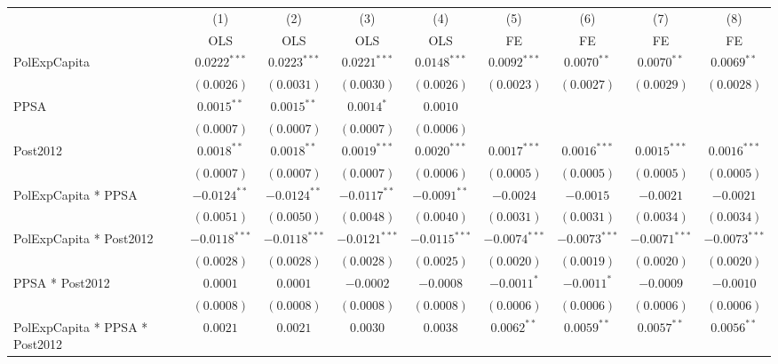 \begin{table}[H]
    \centering
    \scriptsize
    \begin{minipage}{\textwidth}
    \centering
    \begin{tabular}{lcccccccc}
        \toprule
         & (1) & (2) & (3) & (4) & (5) & (6) & (7) & (8) \\
         & OLS & OLS & OLS & OLS & FE & FE & FE & FE \\
        \midrule
        PolExpCapita & $0.0222^{***}$ & $0.0223^{***}$ & $0.0221^{***}$ & $0.0148^{***}$ & $0.0092^{***}$ & $0.0070^{**}$ & $0.0070^{**}$ & $0.0069^{**}$ \\
         & $(0.0026)$ & $(0.0031)$ & $(0.0030)$ & $(0.0026)$ & $(0.0023)$ & $(0.0027)$ & $(0.0029)$ & $(0.0028)$ \\[4pt]
        PPSA & $0.0015^{**}$ & $0.0015^{**}$ & $0.0014^{*}$ & $0.0010$ &  &  &  &  \\
         & $(0.0007)$ & $(0.0007)$ & $(0.0007)$ & $(0.0006)$ &  &  &  &  \\[4pt]
        Post2012 & $0.0018^{**}$ & $0.0018^{**}$ & $0.0019^{***}$ & $0.0020^{***}$ & $0.0017^{***}$ & $0.0016^{***}$ & $0.0015^{***}$ & $0.0016^{***}$ \\
         & $(0.0007)$ & $(0.0007)$ & $(0.0007)$ & $(0.0006)$ & $(0.0005)$ & $(0.0005)$ & $(0.0005)$ & $(0.0005)$ \\[4pt]
        PolExpCapita * PPSA & $-0.0124^{**}$ & $-0.0124^{**}$ & $-0.0117^{**}$ & $-0.0091^{**}$ & $-0.0024$ & $-0.0015$ & $-0.0021$ & $-0.0021$ \\
         & $(0.0051)$ & $(0.0050)$ & $(0.0048)$ & $(0.0040)$ & $(0.0031)$ & $(0.0031)$ & $(0.0034)$ & $(0.0034)$ \\[4pt]
        PolExpCapita * Post2012 & $-0.0118^{***}$ & $-0.0118^{***}$ & $-0.0121^{***}$ & $-0.0115^{***}$ & $-0.0074^{***}$ & $-0.0073^{***}$ & $-0.0071^{***}$ & $-0.0073^{***}$ \\
         & $(0.0028)$ & $(0.0028)$ & $(0.0028)$ & $(0.0025)$ & $(0.0020)$ & $(0.0019)$ & $(0.0020)$ & $(0.0020)$ \\[4pt]
        PPSA * Post2012 & $0.0001$ & $0.0001$ & $-0.0002$ & $-0.0008$ & $-0.0011^{*}$ & $-0.0011^{*}$ & $-0.0009$ & $-0.0010$ \\
         & $(0.0008)$ & $(0.0008)$ & $(0.0008)$ & $(0.0008)$ & $(0.0006)$ & $(0.0006)$ & $(0.0006)$ & $(0.0006)$ \\[4pt]
        PolExpCapita * PPSA * Post2012 & $0.0021$ & $0.0021$ & $0.0030$ & $0.0038$ & $0.0062^{**}$ & $0.0059^{**}$ & $0.0057^{**}$ & $0.0056^{**}$ \\

\end{tabular}
\end{minipage}
\end{table}
